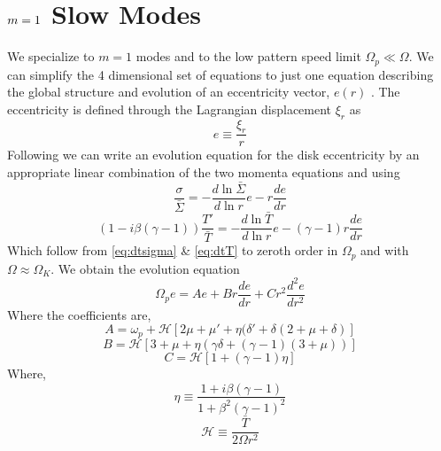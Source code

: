 \documentclass[apj]{emulateapj}
\begin{document}
\section{ $\MakeLowercase{m}=1$ Slow Modes }
We specialize to $m=1$ modes and to the low pattern speed limit $\Omega_p \ll \Omega$. We can simplify the 4 dimensional set of equations to just one equation describing the global structure and evolution of an eccentricity vector, $e(r)$ \citep{og01,go06,papa02}. The eccentricity is defined through the Lagrangian displacement $\xi_r$ as 
\begin{equation}
e \equiv \frac{ \xi_r} {r} 
\end{equation}
 Following \cite{papa02} we can write an evolution equation for the disk eccentricity by an appropriate linear combination of the two momenta equations and using 
 \begin{equation}
\frac{\sigma}{\bar{\Sigma}} = - \frac{d \ln \bar{\Sigma}}{ d \ln r} e - r \frac{d e}{d r} 
\end{equation}
\begin{equation}
(1- i \beta(\gamma -1)) \frac{T'}{\bar{T}} = -\frac{d \ln \bar{T}}{d \ln r} e - (\gamma -1) r \frac{d e}{d r}
\end{equation}
Which follow from \eqref{eq:dtsigma} \& \eqref{eq:dtT} to zeroth order in $\Omega_p$ and with $\Omega \approx \Omega_K$. We obtain the evolution equation 
\begin{equation} \label{eq:coeff_eqn}
\Omega_p e  = A e + B r \frac{d e}{d r} + C r^2 \frac{d^2 e}{ d r^2}
\end{equation}
Where the coefficients are,
\begin{equation}
A = \omega_p  + \mathcal{H} \left[ 2 \mu + \mu'  + \eta ( \delta' + \delta (2 + \mu + \delta) \right]
\end{equation}
\begin{equation}
B = \mathcal{H} \left[ 3 + \mu + \eta \left( \gamma \delta + (\gamma -1 ) (3 + \mu) \right) \right]
\end{equation}
\begin{equation}
C = \mathcal{H} \left[ 1 + (\gamma - 1) \eta \right]
\end{equation}
Where,
\begin{equation}
\eta \equiv \frac{1 + i \beta (\gamma -1)}{1 + \beta^2 (\gamma -1)^2} 
\end{equation}
\begin{equation}
\mathcal{H} \equiv \frac{  \bar{T}}{ 2 \Omega r^2}
\end{equation}
\end{document}
